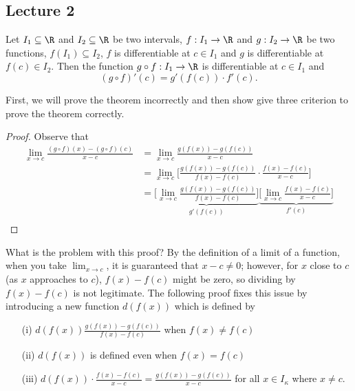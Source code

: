 \subsection{Lecture 2}

\begin{theorem}\label{Chain Rule}
    Let \( {I}_{1} \subseteq  \R  \) and \( {I}_{2} \subseteq  \R   \) be two intervals, \( f: {I}_{1} \to \R  \) and \( g : {I}_{2} \to \R  \) be two functions, \( f({I}_{1}) \subseteq  {I}_{2} \), \( f \) is differentiable at \( c \in {I}_{1} \) and \( g  \) is differentiable at \( f(c) \in {I}_{2} \). Then the function \( g \circ f : {I}_{1} \to \R  \) is differentiable at \( c \in {I}_{1} \) and 
    \[  (g \circ f)'(c) = g'(f(c)) \cdot f'(c). \]
\end{theorem}
First, we will prove the theorem incorrectly and then show give three criterion to prove the theorem correctly.  

\begin{proof}
Observe that 
\begin{align*}
    \lim_{ x \to c  }  \frac{ (g \circ f)(x) - (g \circ f)(c) }{x - c } &= \lim_{ x \to c  }  \frac{ g(f(x)) - g(f(c)) }{  x - c  }  \\
                                                                        &= \lim_{ x \to c  }  \Big[ \frac{ g(f(x)) - g(f(c)) }{  f(x) - f(c) } \cdot \frac{ f(x) - f(c) }{  x - c   } \Big] \\
                                                                        &= \underbrace{\Big[ \lim_{ x \to c  }  \frac{ g(f(x)) - g(f(c)) }{  f(x) - f(c) } \Big]}_{g'(f(c))} \underbrace{\Big[ \lim_{ x \to c  }  \frac{ f(x)  - f(c) }{  x - c  } \Big]}_{f'(c)} \\
\end{align*}
\end{proof}
What is the problem with this proof? By the definition of a limit of a function, when you take \( \lim_{ x \to c  }  \), it is guaranteed that \( x - c \neq 0   \); however, for \( x  \) close to \( c  \) (as \( x  \) approaches to \( c  \)), \( f(x)- f(c) \) might be zero, so dividing by \( f(x) - f(c) \) is not legitimate. The following proof fixes this issue by introducing a new function \( d(f(x)) \) which is defined by
\begin{enumerate}
    \item[(i)] \( d(f(x)) \displaystyle \frac{ g(f(x)) - g(f(c)) }{  f(x) - f(c) }    \) when \( f(x) \neq f(c) \) 
    \item[(ii)] \( d(f(x))  \) is defined even when \( f(x) = f(c) \)  
    \item[(iii)] \( \displaystyle d(f(x)) \cdot \frac{ f(x) - f(c) }{  x - c  }  = \frac{ g(f(x)) - g(f(c)) }{  x - c  }   \) for all \( x \in {I}_{\kappa} \) where \( x \neq c   \).
\end{enumerate}

